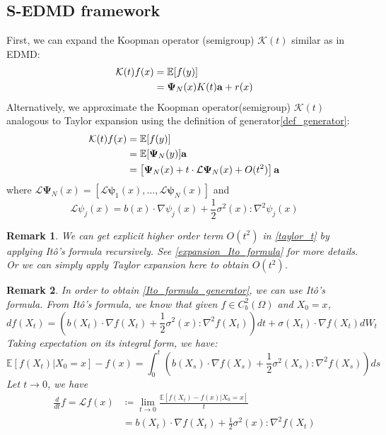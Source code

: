 \documentclass{article}[11]
\newtheorem*{remark}{Remark}
\begin{document}
\subsection*{S-EDMD framework}
First, we can expand the Koopman operator (semigroup) $\mathcal{K}(t)$ similar as in EDMD:
\begin{align}\label{edmd_expansion}
	\mathcal{K}(t) f(x) 
	&= \mathbb{E}[f(y)] \notag\\
	&= \mathbf{\Psi}_N(x)K(t)\mathbf{a} + r(x) 
\end{align}
Alternatively, we approximate the Koopman operator(semigroup) $\mathcal{K}(t)$ analogous to Taylor expansion using the definition of generator\eqref{def_generator}:
\begin{align}\label{taylor_t}
	\mathcal{K}(t)f(x) &= \mathbb{E}[f(y)] \notag\\
	&= \mathbb{E}[\mathbf{\Psi}_N(y)]\mathbf{a} \notag\\
	&= \left[ \mathbf{\Psi}_N(x) + t \cdot \mathcal{L}\mathbf{\Psi}_N(x) + O(t^2)  \right]\mathbf{a}
\end{align}
where $\mathcal{L}\mathbf{\Psi}_N(x) = \left[ \mathcal{L}\mathbf{\psi}_1(x), \dots, \mathcal{L}\mathbf{\psi}_N(x) \right]$ and
\begin{equation}\label{Ito_formula_generator}
	\mathcal{L}\psi_j(x) = b(x)\cdot \nabla\psi_j(x) + \frac{1}{2}\sigma^2(x)\colon \nabla^2 \psi_j(x)
\end{equation}
\begin{remark}
	We can get explicit higher order term $O(t^2)$ in \eqref{taylor_t} by applying It\^{o}'s formula recursively. See \ref{expansion_Ito_formula} for more details. Or we can simply apply Taylor expansion here to obtain $O(t^2)$.
\end{remark}
\begin{remark}
	In order to obtain \eqref{Ito_formula_generator}, we can use It\^{o}'s formula. From It\^{o}'s formula, we know that given $f\in C_b^2(\Omega)$ and $X_0=x$,
	$$ df(X_t) = \left(b(X_t)\cdot \nabla f(X_t) + \frac{1}{2}\sigma^2(x)\colon \nabla^2 f(X_t)\right)dt + \sigma(X_t)\cdot \nabla f(X_t)dW_t $$
	Taking expectation on its integral form, we have: 
	$$\mathbb{E}[f(X_t)|X_0=x]-f(x) = \int_0^t \left( b(X_s)\cdot \nabla f(X_s) + \frac{1}{2}\sigma^2(X_s)\colon \nabla^2 f(X_s) \right) ds$$
	Let $t \to 0$, we have
	\begin{align*}
		\frac{d}{dt}f = \mathcal{L}f(x) &\coloneqq \lim_{t \to 0} \frac{\mathbb{E}[f(X_t)-f(x)|X_0=x]}{t} \\
		&= b(X_t)\cdot \nabla f(X_t) + \frac{1}{2}\sigma^2(x)\colon \nabla^2 f(X_t)
	\end{align*}
\end{remark}
\end{document}
